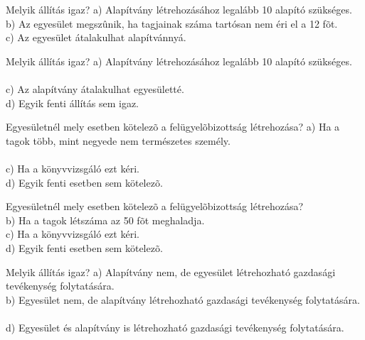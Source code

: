 \begin{frame}

\begin{tcolorbox}[title={55. Kérdés}]
Melyik állítás igaz?
\tcblower
a) Alapítvány létrehozásához legalább 10 alapító szükséges.\\
b) Az egyesület megszûnik, ha tagjainak száma tartósan nem éri el a 12 fõt.\\
c) Az egyesület átalakulhat alapítvánnyá.\\
\end{tcolorbox}

\begin{tcolorbox}[title={56. Kérdés}]
Melyik állítás igaz?
\tcblower
a) Alapítvány létrehozásához legalább 10 alapító szükséges.\\
\\
c) Az alapítvány átalakulhat egyesületté.\\
d) Egyik fenti állítás sem igaz.
\end{tcolorbox}

\begin{tcolorbox}[title={57. Kérdés}]
Egyesületnél mely esetben kötelezõ a felügyelõbizottság létrehozása?
\tcblower
a) Ha a tagok több, mint negyede nem természetes személy.\\
\\
c) Ha a könyvvizsgáló ezt kéri.\\
d) Egyik fenti esetben sem kötelezõ.
\end{tcolorbox}

\begin{tcolorbox}[title={58. Kérdés}]
Egyesületnél mely esetben kötelezõ a felügyelõbizottság létrehozása?
\tcblower
{}\\
b) Ha a tagok létszáma az 50 fõt meghaladja.\\
c) Ha a könyvvizsgáló ezt kéri.\\
d) Egyik fenti esetben sem kötelezõ.
\end{tcolorbox}

\end{frame}


\begin{frame}

\begin{tcolorbox}[title={59. Kérdés}]
Melyik állítás igaz?
\tcblower
a) Alapítvány nem, de egyesület létrehozható gazdasági tevékenység folytatására.\\
b) Egyesület nem, de alapítvány létrehozható gazdasági tevékenység folytatására.\\
\\
d) Egyesület és alapítvány is létrehozható gazdasági tevékenység folytatására.
\end{tcolorbox}

\end{frame}

